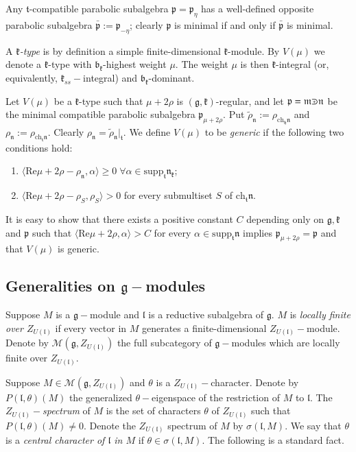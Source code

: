 \documentclass[default]{./styles/svmult}
\newcommand{\supp}{\mathrm{supp}}
\newcommand{\ch}{\mathrm{ch}}
\newcommand{\bb}{\mathfrak{b}}
\renewcommand{\gg}{\mathfrak{g}}
\newcommand{\hh}{\mathfrak{h}}
\newcommand{\kk}{\mathfrak{k}}
\renewcommand{\ll}{\mathfrak{l}}
\newcommand{\mm}{\mathfrak{m}}
\newcommand{\nn}{\mathfrak{n}}
\newcommand{\pp}{\mathfrak{p}}
\renewcommand{\tt}{\mathfrak{t}}
\def\crplus{\hbox{$\supset${\raise1.05pt\hbox{\kern -0.55em ${\scriptscriptstyle +}$}}\ }}
\begin{document}
Any $\tt$-compatible parabolic subalgebra $\pp =\pp_\eta$ has a well-defined opposite parabolic subalgebra $\bar{\pp}:=\pp_{-\eta}$; clearly $\pp$ is minimal if and only if $\bar{\pp}$ is minimal.

A \textit{$\kk$-type} is by definition a simple finite-dimensional $\kk$-module. By $V(\mu)$ we denote a $\kk$-type with $\bb_\kk$-highest weight $\mu$. The weight $\mu$ is then $\kk$-integral (or, equivalently, $\kk_{ss}-$integral) and $\bb_\kk$-dominant.

Let $V(\mu)$ be a $\kk$-type such that $\mu+2\rho$ is $(\gg,\kk)$-regular, and let $\pp=\mm\crplus\nn$ be the minimal compatible parabolic subalgebra $\pp_{\mu+2\rho}$. Put $\tilde{\rho}_\nn :=\rho_{\ch_\hh \nn}$ and $\rho_\nn:=\rho_{\ch_\tt\nn}$. Clearly $\rho_\nn =\tilde{\rho}_\nn |_\tt$. We define $V(\mu)$ to be \textit{generic} if the following two conditions hold:
\begin{enumerate}
\item $\langle\mathrm{Re}\mu+2\rho-\rho_\nn,\alpha\rangle\geq 0\;\forall\alpha\in\supp_\tt\nn_\kk$;
\item $\langle\mathrm{Re}\mu+2\rho-\rho_S,\rho_S\rangle >0$ for every submultiset $S$ of $\ch_\tt\nn$.
\end{enumerate}

It is easy to show that there exists a positive constant $C$ depending only on $\gg,\kk$ and $\pp$ such that $\langle\mathrm{Re}\mu+2\rho,\alpha\rangle >C$ for every $\alpha\in\supp_\tt\nn$ implies $\pp_{\mu+2\rho}=\pp$ and that $V(\mu)$ is generic.

\subsection{Generalities on $\gg-$modules}\label{sect:1.3}

Suppose $M$ is a $\gg-$module and $\ll$ is a reductive subalgebra of $\gg$. $M$ is \textit{locally finite over $Z_{U(\ll)}$} if every vector in $M$ generates a finite-dimensional $Z_{U(\ll)}-$module. Denote by $\mathcal{M}(\gg,Z_{U(\ll)})$ the full subcategory of $\gg-$modules which are locally finite over $Z_{U(\ll)}$. 

Suppose $M \in \mathcal{M}(\gg,Z_{U(\ll)})$ and $\theta$ is a $Z_{U(\ll)}-$character. Denote by $P(\ll, \theta)(M)$ the generalized $\theta-$eigenspace of the restriction of $M$ to $\ll$. The $Z_{U(\ll)}-$\textit{spectrum} of $M$ is the set of characters $\theta$ of $Z_{U(\ll)}$ such that $P(\ll, \theta)(M) \neq 0$. Denote the $Z_{U(\ll)}$ spectrum of $M$ by $\sigma(\ll,M)$. We say that $\theta$ is a \textit{central character of $\ll$ in $M$} if $\theta \in \sigma(\ll,M)$. The following is a standard fact.
\end{document}
